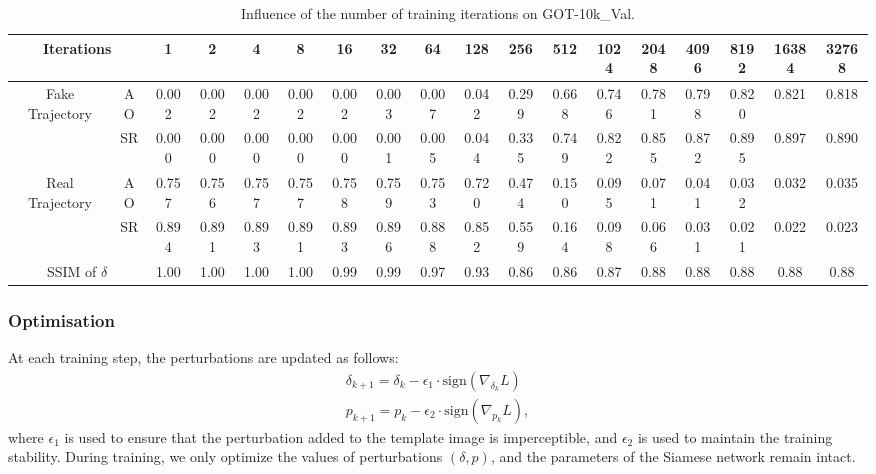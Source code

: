 \documentclass{article}
\begin{document}
\begin{table}
\centering
\scriptsize
\tabcolsep=4.0pt
\label{tab:iter}
\begin{tabular}{cc|cccccccccccccccc} 
\toprule
\multicolumn{2}{c|}{Iterations}     & 1     & 2     & 4     & 8     & 16    & 32    & 64    & 128   & 256   & 512   & 1024  & 2048  & 4096  & 8192  & 16384 & 32768  \\ 
\midrule
\multirow{2}{*}{Fake Trajectory} & AO    & 0.002 & 0.002 & 0.002 & 0.002 & 0.002 & 0.003 & 0.007 & 0.042 & 0.299 & 0.668 & 0.746 & 0.781 & 0.798 & 0.820 & 0.821 & 0.818  \\
                                 & SR    & 0.000 & 0.000 & 0.000 & 0.000 & 0.000 & 0.001 & 0.005 & 0.044 & 0.335 & 0.749 & 0.822 & 0.855 & 0.872 & 0.895 & 0.897 & 0.890  \\ 
\midrule
\multirow{2}{*}{Real Trajectory} & AO    & 0.757 & 0.756 & 0.757 & 0.757 & 0.758 & 0.759 & 0.753 & 0.720 & 0.474 & 0.150 & 0.095 & 0.071 & 0.041 & 0.032 & 0.032 & 0.035  \\
                                 & SR    & 0.894 & 0.891 & 0.893 & 0.891 & 0.893 & 0.896 & 0.888 & 0.852 & 0.559 & 0.164 & 0.098 & 0.066 & 0.031 & 0.021 & 0.022 & 0.023  \\ 
\midrule
\multicolumn{2}{c|}{SSIM of $\delta$}                        & 1.00  & 1.00  & 1.00  & 1.00  & 0.99  & 0.99  & 0.97  & 0.93  & 0.86  & 0.86  & 0.87  & 0.88  & 0.88  & 0.88  & 0.88  & 0.88   \\
\bottomrule
\end{tabular}
\caption{Influence of the number of training iterations on GOT-10k\_Val.}
\label{tab:iter}
\end{table}

\subsubsection{Optimisation}

At each training step, the perturbations are updated as follows:
\begin{gather}
\delta_{k+1} = \delta_{k} - \epsilon_1 \cdot \text{sign}(\nabla_{\delta_k}L)\\
p_{k+1} = p_{k} - \epsilon_2 \cdot \text{sign}(\nabla_{p_k}L),
\end{gather}
where $\epsilon_1$ is used to ensure that the perturbation added to the template image is imperceptible, and $\epsilon_2$ is used to maintain the training stability.
During training, we only optimize the values of perturbations $(\delta, p)$, and the parameters of the Siamese network remain intact.
\end{document}
